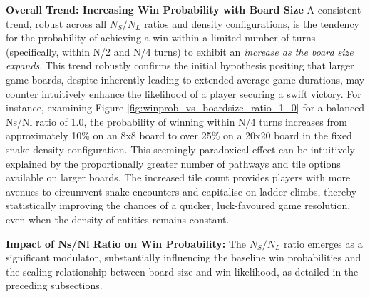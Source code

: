 \textbf{Overall Trend: Increasing Win Probability with Board Size} A consistent trend, robust across all $N_S/N_L$ ratios and density configurations, is the tendency for the probability of achieving a win within a limited number of turns (specifically, within N/2 and N/4 turns) to exhibit an \textit{increase as the board size expands}. This trend robustly confirms the initial hypothesis positing that larger game boards, despite inherently leading to extended average game durations, may counter intuitively enhance the likelihood of a player securing a swift victory.  For instance, examining Figure \ref{fig:winprob_vs_boardsize_ratio_1_0} for a balanced Ns/Nl ratio of 1.0, the probability of winning within N/4 turns increases from approximately 10\% on an 8x8 board to over 25\% on a 20x20 board in the fixed snake density configuration. This seemingly paradoxical effect can be intuitively explained by the proportionally greater number of pathways and tile options available on larger boards.  The increased tile count provides players with more avenues to circumvent snake encounters and capitalise on ladder climbs, thereby statistically improving the chances of a quicker, luck-favoured game resolution, even when the density of entities remains constant.

\textbf{Impact of Ns/Nl Ratio on Win Probability:}  The $N_S/N_L$ ratio emerges as a significant modulator, substantially influencing the baseline win probabilities and the scaling relationship between board size and win likelihood, as detailed in the preceding subsections.

